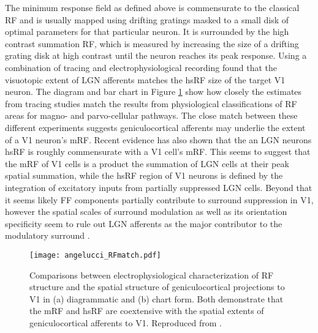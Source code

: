The minimum response field as defined above is commensurate to the
classical RF and is usually mapped using drifting gratings masked to a
small disk of optimal parameters for that particular neuron. It is
surrounded by the high contrast summation RF, which is measured by
increasing the size of a drifting grating disk at high contrast until
the neuron reaches its peak response. Using a combination of tracing
and electrophysiological recording \citep{Angelucci2006a} found that
the visuotopic extent of LGN afferents matches the hsRF size of the
target V1 neuron. The diagram and bar chart in Figure \ref{FFmatch}
show how closely the estimates from tracing studies match the results
from physiological classifications of RF areas for magno- and
parvo-cellular pathways. The close match between these different
experiments suggests geniculocortical afferents may underlie the extent
of a V1 neuron's mRF. Recent evidence has also shown that the an LGN
neurons hsRF is roughly commensurate with a V1 cell's mRF. This seems
to suggest that the mRF of V1 cells is a product the summation of LGN
cells at their peak spatial summation, while the hsRF region of V1
neurons is defined by the integration of excitatory inputs from
partially suppressed LGN cells. Beyond that it seems likely FF
components partially contribute to surround suppression in V1, however
the spatial scales of surround modulation as well as its orientation
specificity seem to rule out LGN afferents as the major contributor to
the modulatory surround \citep{Angelucci2002,Angelucci2006a}.

\begin{figure}
	\centering
        \texttt{[image: angelucci\_RFmatch.pdf]}
	\caption[Comparison between anatomical and electrophysiological
      estimates of V1 receptive field extents. Reproduced from
      \cite{Angelucci2006}.]{Comparisons between electrophysiological
      characterization of RF structure and the spatial structure of
      geniculocortical projections to V1 in (a) diagrammatic and (b)
      chart form. Both demonstrate that the mRF and hsRF are
      coextensive with the spatial extents of geniculocortical
      afferents to V1. Reproduced from \cite{Angelucci2006}.}
	\label{FFmatch}
\end{figure}

